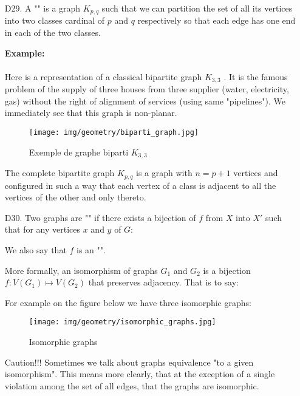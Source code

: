 {\begin{enumerate}
	\item[D29.] A "" is a graph $K_{p,q}$ such that we can partition the set of all its vertices into two classes cardinal of $p$ and $q$ respectively so that each edge has one end in each of the two classes.
		\begin{tcolorbox}[colframe=black,colback=white,sharp corners]
		\textbf{{\Large {}}Example:}\\\\
		Here is a representation of a classical bipartite graph $K_{3,3}$ . It is the famous problem of the supply of three houses from three supplier (water, electricity, gas) without the right of alignment of services (using same "pipelines"). We immediately see that this graph is non-planar.
		\begin{figure}[H]
			\centering
			\texttt{[image: img/geometry/biparti\_graph.jpg]}
			\caption{Exemple de graphe biparti $K_{3,3}$}
		\end{figure}
		\end{tcolorbox}
		\begin{tcolorbox}[title=Remark,colframe=black,arc=10pt]
		The complete bipartite graph $K_{p,q}$ is a graph with $n=p+1$ vertices and configured in such a way that each vertex of a class is adjacent to all the vertices of the other and only thereto.
		\end{tcolorbox}	
		
		\item[D30.] Two graphs are "" if there exists a bijection of $f$ from $X$ into $X'$ such that for any vertices $x$ and $y$ of $G$:
		
		We also say that $f$ is an "".
		
		More formally, an isomorphism of graphs $G_1$ and $G_2$ is a bijection $f:V(G_1)\mapsto V(G_2)$ that preserves adjacency. That is to say:
	
	
		For example on the figure below we have three isomorphic graphs:
		\begin{figure}[H]
			\centering
			\texttt{[image: img/geometry/isomorphic\_graphs.jpg]}
			\caption{Isomorphic graphs}
		\end{figure}
		\begin{tcolorbox}[colback=red!5,borderline={1mm}{2mm}{red!5},arc=0mm,boxrule=0pt]
	Caution!!! Sometimes we talk about graphs equivalence "to a given isomorphism". This means more clearly, that at the exception of a single violation among the set of all edges, that the graphs are isomorphic.
		\end{tcolorbox}
		

\end{enumerate}}
